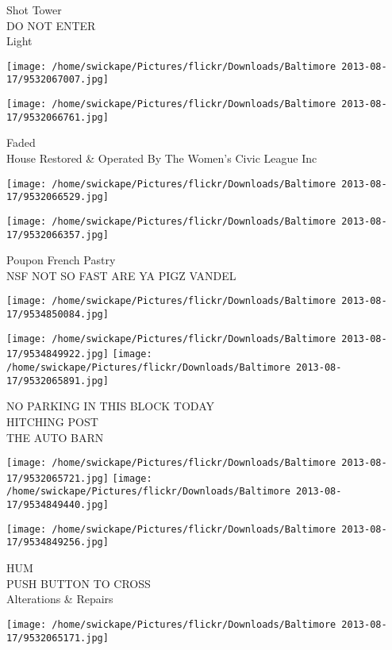 \documentclass[10pt,letterpaper]{article}
\begin{document}
Shot Tower\\
DO NOT ENTER\\
Light
\pagebreak

\texttt{[image: /home/swickape/Pictures/flickr/Downloads/Baltimore 2013-08-17/9532067007.jpg]}

\vspace{0.25in}
\texttt{[image: /home/swickape/Pictures/flickr/Downloads/Baltimore 2013-08-17/9532066761.jpg]}

Faded\\
House Restored \& Operated By The Women's Civic League Inc
\pagebreak

\texttt{[image: /home/swickape/Pictures/flickr/Downloads/Baltimore 2013-08-17/9532066529.jpg]}

\vspace{0.25in}
\texttt{[image: /home/swickape/Pictures/flickr/Downloads/Baltimore 2013-08-17/9532066357.jpg]}

Poupon French Pastry\\
NSF NOT SO FAST ARE YA PIGZ VANDEL
\pagebreak

\texttt{[image: /home/swickape/Pictures/flickr/Downloads/Baltimore 2013-08-17/9534850084.jpg]}

\vspace{0.25in}
\texttt{[image: /home/swickape/Pictures/flickr/Downloads/Baltimore 2013-08-17/9534849922.jpg]}
\texttt{[image: /home/swickape/Pictures/flickr/Downloads/Baltimore 2013-08-17/9532065891.jpg]}

NO PARKING IN THIS BLOCK TODAY\\
HITCHING POST\\
THE AUTO BARN
\pagebreak

\texttt{[image: /home/swickape/Pictures/flickr/Downloads/Baltimore 2013-08-17/9532065721.jpg]}
\texttt{[image: /home/swickape/Pictures/flickr/Downloads/Baltimore 2013-08-17/9534849440.jpg]}

\texttt{[image: /home/swickape/Pictures/flickr/Downloads/Baltimore 2013-08-17/9534849256.jpg]}

HUM\\
PUSH BUTTON TO CROSS\\
Alterations \& Repairs
\pagebreak

\texttt{[image: /home/swickape/Pictures/flickr/Downloads/Baltimore 2013-08-17/9532065171.jpg]}
\end{document}
